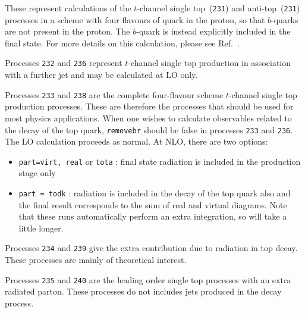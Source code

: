 \label{subsec:stopb}

These represent calculations of the $t$-channel single top~({\tt 231}) and anti-top~({\tt 231})
processes in a scheme with four flavours of quark in the proton, so that $b$-quarks are not present in the proton.
The $b$-quark is instead explicitly included in the final state.
For more details on this calculation, please see Ref.~\cite{Campbell:2009ss}.

Processes {\tt 232} and {\tt 236} represent $t$-channel single top production in association
with a further jet and may be calculated at LO only.

Processes {\tt 233} and {\tt 238} are the complete four-flavour scheme $t$-channel single top production processes.
These are therefore the processes that should be used for most physics applications.
When one wishes to calculate observables related to the decay of the top
quark, {\tt removebr} should be false in processes {\tt 233} and {\tt 236}.
The LO calculation proceeds as normal. At NLO, there are two options:
\begin{itemize}
\item {\tt part=virt, real} or {\tt tota} : final state radiation is included
in the production stage only
\item {\tt part = todk} : radiation is included in the decay of the top
quark also and the final result corresponds to the sum of real and virtual
diagrams.
Note that these runs automatically perform an extra integration, so
will take a little longer.
\end{itemize}


Processes {\tt 234} and {\tt 239} give the extra contribution due to radiation
in top decay. These processes are mainly of theoretical interest.

Processes {\tt 235} and {\tt 240} are the leading order single top processes with an
extra radiated parton. These processes do not includes jets produced in the decay process.
